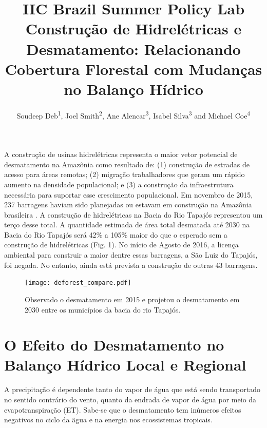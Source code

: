 \documentclass[DIV=calc, paper=a4, fontsize=11pt,twocolumn,margin=.5in]{scrartcl}	 %
\title{{\color{black}IIC Brazil Summer Policy Lab}\\ \vspace{.3cm}Constru\c c\~{a}o de Hidrel\'{e}tricas e Desmatamento: Relacionando Cobertura Florestal com Mudan\c cas no Balan\c co H\'{i}drico} %
\author{Soudeep Deb\textsuperscript{1}, Joel Smith\textsuperscript{2}, Ane Alencar\textsuperscript{3}, Isabel Silva\textsuperscript{3} and Michael Coe\textsuperscript{4}\\} %
\date{} %
\newcommand{\initial}[1]{ %
\lettrine[lines=3,lhang=0.3,nindent=0em]{
\color{DarkGoldenrod}
{\textsf{#1}}}{}}
\begin{document}
\maketitle %
\thispagestyle{fancy} %
\initial{A} constru\c c\~{a}o de usinas hidrel\'{e}tricas representa o maior vetor potencial de desmatamento na Amaz\^ onia como resultado de: (1) constru\c c\~{a}o de estradas de acesso para \'{a}reas remotas; (2) migra\c c\~{a}o trabalhadores que geram um r\'{a}pido aumento na densidade populacional; e (3) a constru\c c\~{a}o da infraestrutura necess\'{a}ria para suportar esse crescimento populacional. Em novembro de 2015, 237 barragens haviam sido planejadas ou estavam em constru\c c\~{a}o na Amaz\^ onia brasileira \cite{castello2015large}. A constru\c c\~{a}o de hidrel\'{e}tricas na Bacia do Rio Tapaj\'{o}s representou um ter\c co desse total. A quantidade estimada de \'{a}rea total desmatada at\'{e} 2030 na Bacia do Rio Tapaj\'{o}s ser\'{a} 42\% a 105\% maior do que o esperado sem a constru\c c\~{a}o de hidrel\'{e}tricas (Fig. 1). No in\'{i}cio de Agosto de 2016, a licen\c ca ambiental para construir a maior dentre essas barragens, a S\~{a}o Luiz do Tapaj\'{o}s, foi negada. No entanto, ainda est\'{a} prevista a constru\c c\~{a}o de outras 43 barragens.

\begin{figure}
  \centering
  \texttt{[image: deforest\_compare.pdf]}
 \caption{Observado o desmatamento em 2015 e projetou o desmatamento em 2030 entre os munic\'{i}pios da bacia do rio Tapaj\'{o}s.}
  \label{fig:deforest}
\end{figure}




\section*{O Efeito do Desmatamento no Balan\c co H\'{i}drico Local e Regional}
A precipita\c c\~{a}o \'{e} dependente tanto do vapor de \'{a}gua que est\'{a} sendo transportado no sentido contr\'{a}rio do vento, quanto da endrada de vapor de \'{a}gua por meio da evapotranspira\c c\~{a}o (ET). Sabe-se que o desmatamento tem in\'umeros efeitos negativos no ciclo da \~{a}gua e na energia nos ecossistemas tropicais. 
\end{document}
